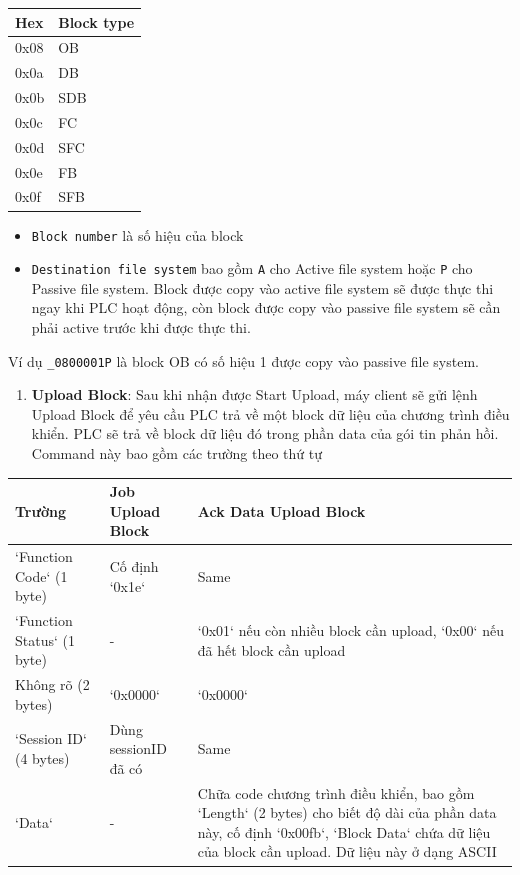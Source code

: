 \documentclass[../main.tex]{subfiles}
\begin{document}
\begin{table}[H]
    \centering
    \footnotesize
    \begin{tabular}{|l|l|}
        \hline
        \textbf{Hex} & \textbf{Block type} \\
        \hline
        0x08 & OB \\
        \hline
        0x0a & DB \\
        \hline
        0x0b & SDB \\
        \hline
        0x0c & FC \\
        \hline
        0x0d & SFC \\
        \hline
        0x0e & FB \\
        \hline
        0x0f & SFB \\
        \hline
    \end{tabular}
\end{table}


\begin{itemize}
    \item \texttt{Block number} là số hiệu của block
    \item \texttt{Destination file system} bao gồm \texttt{A} cho Active file system hoặc \texttt{P} cho Passive file system. Block được copy vào active file system sẽ được thực thi ngay khi PLC hoạt động, còn block được copy vào passive file system sẽ cần phải active trước khi được thực thi.
\end{itemize}


    Ví dụ \texttt{\_0800001P} là block OB có số hiệu 1 được copy vào passive file system.


\begin{enumerate}
    \item \textbf{Upload Block}: Sau khi nhận được Start Upload, máy client sẽ gửi lệnh Upload Block để yêu cầu PLC trả về một block dữ liệu của chương trình điều khiển. PLC sẽ trả về block dữ liệu đó trong phần data của gói tin phản hồi. Command này bao gồm các trường theo thứ tự
\end{enumerate}


\begin{table}[H]
    \centering
    \footnotesize
    \begin{tabular}{|l|l|l|}
        \hline
        \textbf{Trường} & \textbf{Job Upload Block} & \textbf{Ack Data Upload Block} \\
        \hline
        `Function Code` (1 byte) & Cố định `0x1e` & Same \\
        \hline
        `Function Status` (1 byte) & - & `0x01` nếu còn nhiều block cần upload, `0x00` nếu đã hết block cần upload \\
        \hline
        Không rõ (2 bytes) & `0x0000` & `0x0000` \\
        \hline
        `Session ID` (4 bytes) & Dùng sessionID đã có & Same \\
        \hline
        `Data` & - & Chữa code chương trình điều khiển, bao gồm `Length` (2 bytes) cho biết độ dài của phần data này, cố định `0x00fb`, `Block Data` chứa dữ liệu của block cần upload. Dữ liệu này ở dạng ASCII \\
        \hline
    \end{tabular}
\end{table}
\end{document}
